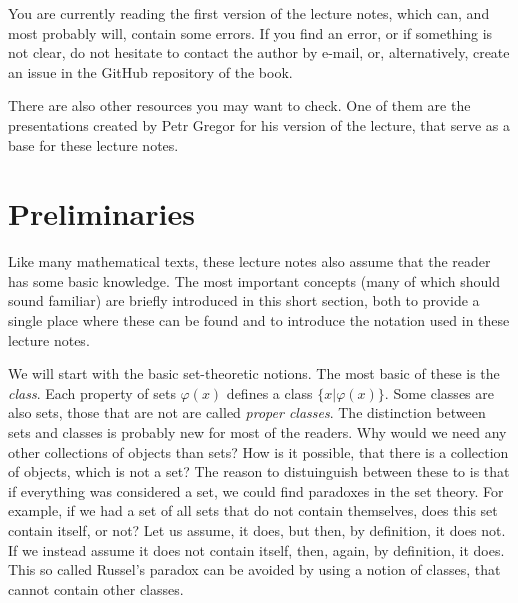 You are currently reading the first version of the lecture notes, which can, and most probably will, contain some errors. If you find an error, or if something is not clear, do not hesitate to contact the author by e-mail, or, alternatively, create an issue in the GitHub repository of the book. 

There are also other resources you may want to check. One of them are the presentations created by Petr Gregor for his version of the lecture, that serve as a base for these lecture notes.


\section{Preliminaries}

Like many mathematical texts, these lecture notes also assume that the reader has some basic knowledge. The most important concepts (many of which should sound familiar) are briefly introduced in this short section, both to provide a single place where these can be found and to introduce the notation used in these lecture notes.

We will start with the basic set-theoretic notions. The most basic of these is the \emph{class}. Each property of sets $\varphi(x)$ defines a class $\{x|\varphi(x)\}$. Some classes are also sets, those that are not are called \emph{proper classes}. The distinction between sets and classes is probably new for most of the readers. Why would we need any other collections of objects than sets? How is it possible, that there is a collection of objects, which is not a set? The reason to distuinguish between these to is that if everything was considered a set, we could find paradoxes in the set theory. For example, if we had a set of all sets that do not contain themselves, does this set contain itself, or not? Let us assume, it does, but then, by definition, it does not. If we instead assume it does not contain itself, then, again, by definition, it does. This so called Russel's paradox can be avoided by using a notion of classes, that cannot contain other classes. 

